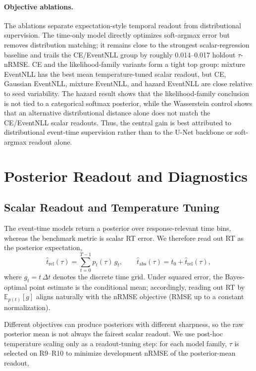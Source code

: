 \documentclass[12pt]{article}
\begin{document}
\paragraph{Objective ablations.}
The ablations separate expectation-style temporal readout from distributional supervision. The time-only model directly optimizes soft-argmax error but removes distribution matching; it remains close to the strongest scalar-regression baseline and trails the CE/EventNLL group by roughly 0.014--0.017 holdout \(\tau\)-nRMSE. CE and the likelihood-family variants form a tight top group: mixture EventNLL has the best mean temperature-tuned scalar readout, but CE, Gaussian EventNLL, mixture EventNLL, and hazard EventNLL are close relative to seed variability. The hazard result shows that the likelihood-family conclusion is not tied to a categorical softmax posterior, while the Wasserstein control shows that an alternative distributional distance alone does not match the CE/EventNLL scalar readouts. Thus, the central gain is best attributed to distributional event-time supervision rather than to the U-Net backbone or soft-argmax readout alone.

\section{Posterior Readout and Diagnostics}
\label{sec:posterior_diagnostics}

\subsection{Scalar Readout and Temperature Tuning}

The event-time models return a posterior over response-relevant time bins, whereas the benchmark metric is scalar RT error. We therefore read out RT as the posterior expectation,
\begin{equation}
\label{eq:rt_soft_argmax}
\hat t_{\mathrm{rel}}(\tau)=\sum_{t=0}^{T-1} p_t(\tau)\, g_t,
\qquad
\hat t_{\mathrm{abs}}(\tau)=t_0+\hat t_{\mathrm{rel}}(\tau),
\end{equation}
where $g_t=t\,\Delta t$ denotes the discrete time grid. Under squared error, the Bayes-optimal point estimate is the
conditional mean; accordingly, reading out RT by $\mathbb{E}_{p(t)}[g]$ aligns naturally with the nRMSE objective (RMSE
up to a constant normalization).

Different objectives can produce posteriors with different sharpness, so the raw posterior mean is not always the fairest scalar readout. We use post-hoc temperature scaling \citep{guo2017calibration} only as a readout-tuning step: for each model family, \(\tau\) is selected on R9--R10 to minimize development nRMSE of the posterior-mean readout,
\end{document}
